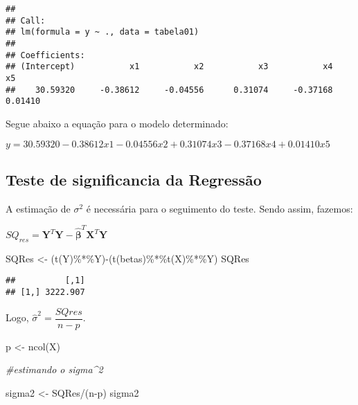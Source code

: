 \documentclass[
]{article}
\newenvironment{Shaded}{\begin{snugshade}}{\end{snugshade}}
\newcommand{\CommentTok}[1]{\textcolor[rgb]{0.56,0.35,0.01}{\textit{#1}}}
\newcommand{\FunctionTok}[1]{\textcolor[rgb]{0.00,0.00,0.00}{#1}}
\newcommand{\NormalTok}[1]{#1}
\newcommand{\OtherTok}[1]{\textcolor[rgb]{0.56,0.35,0.01}{#1}}
\newcommand{\SpecialCharTok}[1]{\textcolor[rgb]{0.00,0.00,0.00}{#1}}
\begin{document}
\begin{verbatim}
## 
## Call:
## lm(formula = y ~ ., data = tabela01)
## 
## Coefficients:
## (Intercept)           x1           x2           x3           x4           x5  
##    30.59320     -0.38612     -0.04556      0.31074     -0.37168      0.01410
\end{verbatim}

Segue abaixo a equação para o modelo determinado:

\(y= 30.59320 - 0.38612x1 - 0.04556x2 + 0.31074x3 - 0.37168x4 + 0.01410x5\)

\hypertarget{teste-de-significancia-da-regressuxe3o}{%
\subsection{Teste de significancia da
Regressão}\label{teste-de-significancia-da-regressuxe3o}}

A estimação de \(\sigma^2\) é necessária para o seguimento do teste.
Sendo assim, fazemos:

\(SQ_{res}=\boldsymbol{Y}^{T}\boldsymbol{Y}-\widehat{\boldsymbol{\beta}}^{T}\boldsymbol{X}^{T}\boldsymbol{Y}\)

\begin{Shaded}
\begin{Highlighting}[]
\NormalTok{SQRes }\OtherTok{\textless{}{-}}\NormalTok{ (}\FunctionTok{t}\NormalTok{(Y)}\SpecialCharTok{\%*\%}\NormalTok{Y)}\SpecialCharTok{{-}}\NormalTok{(}\FunctionTok{t}\NormalTok{(betas)}\SpecialCharTok{\%*\%}\FunctionTok{t}\NormalTok{(X)}\SpecialCharTok{\%*\%}\NormalTok{Y)}
\NormalTok{SQRes}
\end{Highlighting}
\end{Shaded}

\begin{verbatim}
##          [,1]
## [1,] 3222.907
\end{verbatim}

Logo, \(\widehat{\sigma}^2=\dfrac{SQres}{n-p}\).

\begin{Shaded}
\begin{Highlighting}[]
\NormalTok{p }\OtherTok{\textless{}{-}} \FunctionTok{ncol}\NormalTok{(X)}

\CommentTok{\#estimando o sigma\^{}2}

\NormalTok{sigma2 }\OtherTok{\textless{}{-}}\NormalTok{ SQRes}\SpecialCharTok{/}\NormalTok{(n}\SpecialCharTok{{-}}\NormalTok{p)}
\NormalTok{sigma2}
\end{Highlighting}
\end{Shaded}
\end{document}
